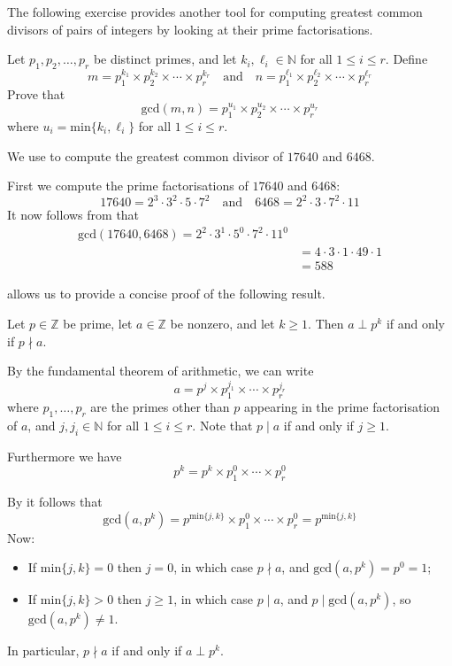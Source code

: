 The following exercise provides another tool for computing greatest common divisors of pairs of integers by looking at their prime factorisations.

\begin{exercise}
\label{exGCDfromFTA}
Let $p_1,p_2,\dots,p_r$ be distinct primes, and let $k_i,\ell_i \in \mathbb{N}$ for all $1 \le i \le r$. Define
\[ m = p_1^{k_1} \times p_2^{k_2} \times \cdots \times p_r^{k_r} \quad \text{and} \quad n = p_1^{\ell_1} \times p_2^{\ell_2} \times \cdots \times p_r^{\ell_r} \]
Prove that
\[ \mathrm{gcd}(m,n) = p_1^{u_1} \times p_2^{u_2} \times \cdots \times p_r^{u_r} \]
where $u_i = \mathrm{min} \{ k_i, \ell_i \}$ for all $1 \le i \le r$.
\end{exercise}

\begin{example}
We use  to compute the greatest common divisor of $17640$ and $6468$.

First we compute the prime factorisations of $17640$ and $6468$:
\[ 17640 = 2^3 \cdot 3^2 \cdot 5 \cdot 7^2 \quad \text{and} \quad 6468 = 2^2 \cdot 3 \cdot 7^2 \cdot 11 \]
It now follows from  that
\begin{align*}
\mathrm{gcd}(17640,6468) = 2^2 \cdot 3^1 \cdot 5^0 \cdot 7^2 \cdot 11^0 \\
&= 4 \cdot 3 \cdot 1 \cdot 49 \cdot 1 \\
&= 588
\end{align*}
\end{example}

 allows us to provide a concise proof of the following result.

\begin{corollary}
\label{corCoprimeToPrimeIffNotDivisibleByPrime}
Let $p \in \mathbb{Z}$ be prime, let $a \in \mathbb{Z}$ be nonzero, and let $k \ge 1$. Then $a \perp p^k$ if and only if $p \nmid a$.
\end{corollary}

\begin{cproof}
By the fundamental theorem of arithmetic, we can write
\[ a = p^j \times p_1^{j_1} \times \cdots \times p_r^{j_r} \]
where $p_1, \dots, p_r$ are the primes other than $p$ appearing in the prime factorisation of $a$, and $j,j_i \in \mathbb{N}$ for all $1 \le i \le r$. Note that $p \mid a$ if and only if $j \ge 1$.

Furthermore we have
\[ p^k = p^k \times p_1^0 \times \cdots \times p_r^0 \]

By  it follows that
\[ \mathrm{gcd}(a,p^k) = p^{\mathrm{min}\{ j,k \}} \times p_1^0 \times \cdots \times p_r^0 = p^{\mathrm{min} \{ j,k \}} \]
Now:
\begin{itemize}
\item If $\mathrm{min} \{ j, k \} = 0$ then $j = 0$, in which case $p \nmid a$, and $\mathrm{gcd}(a,p^k) = p^0 = 1$;
\item If $\mathrm{min} \{ j, k \} > 0$ then $j \ge 1$, in which case $p \mid a$, and $p \mid \mathrm{gcd}(a,p^k)$, so $\mathrm{gcd}(a,p^k) \ne 1$.
\end{itemize}
In particular, $p \nmid a$ if and only if $a \perp p^k$.
\end{cproof}

